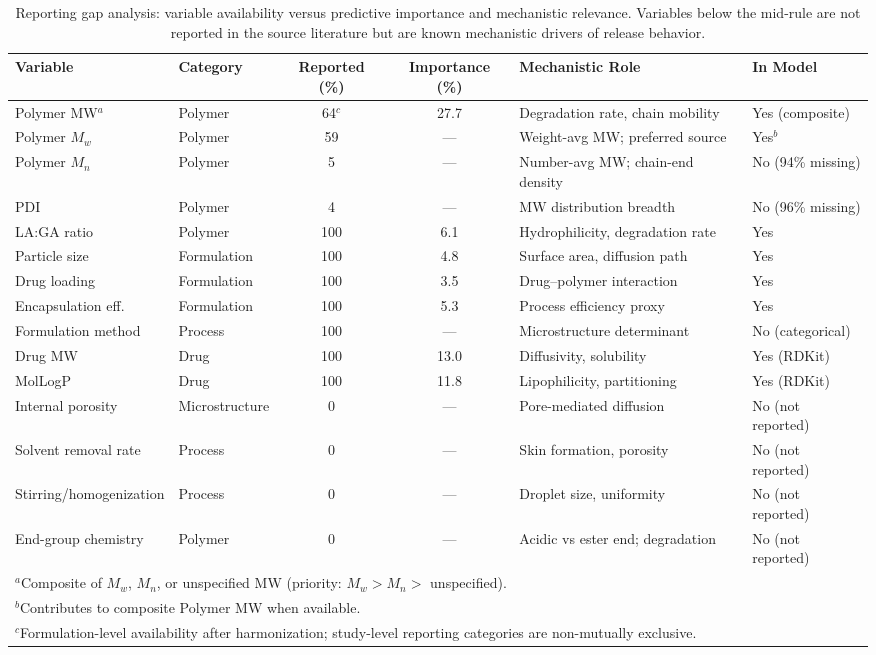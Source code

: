 \documentclass[preprint,12pt,authoryear]{elsarticle}
\begin{document}

\begin{table}[H]
\centering
\caption{Reporting gap analysis: variable availability versus predictive importance and mechanistic relevance. Variables below the mid-rule are not reported in the source literature but are known mechanistic drivers of release behavior.}
\label{tab:reporting_gaps}
\small
\begin{tabular}{llccll}
\toprule
Variable & Category & Reported (\%) & Importance (\%) & Mechanistic Role & In Model \\
\midrule
Polymer MW$^{a}$ & Polymer & 64$^{c}$ & 27.7 & Degradation rate, chain mobility & Yes (composite) \\
Polymer $M_w$ & Polymer & 59 & --- & Weight-avg MW; preferred source & Yes$^{b}$ \\
Polymer $M_n$ & Polymer & 5 & --- & Number-avg MW; chain-end density & No (94\% missing) \\
PDI & Polymer & 4 & --- & MW distribution breadth & No (96\% missing) \\
LA:GA ratio & Polymer & 100 & 6.1 & Hydrophilicity, degradation rate & Yes \\
Particle size & Formulation & 100 & 4.8 & Surface area, diffusion path & Yes \\
Drug loading & Formulation & 100 & 3.5 & Drug--polymer interaction & Yes \\
Encapsulation eff. & Formulation & 100 & 5.3 & Process efficiency proxy & Yes \\
Formulation method & Process & 100 & --- & Microstructure determinant & No (categorical) \\
Drug MW & Drug & 100 & 13.0 & Diffusivity, solubility & Yes (RDKit) \\
MolLogP & Drug & 100 & 11.8 & Lipophilicity, partitioning & Yes (RDKit) \\
\midrule
Internal porosity & Microstructure & 0 & --- & Pore-mediated diffusion & No (not reported) \\
Solvent removal rate & Process & 0 & --- & Skin formation, porosity & No (not reported) \\
Stirring/homogenization & Process & 0 & --- & Droplet size, uniformity & No (not reported) \\
End-group chemistry & Polymer & 0 & --- & Acidic vs ester end; degradation & No (not reported) \\
\bottomrule
\multicolumn{6}{l}{\footnotesize $^{a}$Composite of $M_w$, $M_n$, or unspecified MW (priority: $M_w > M_n >$ unspecified).} \\
\multicolumn{6}{l}{\footnotesize $^{b}$Contributes to composite Polymer MW when available.} \\
\multicolumn{6}{l}{\footnotesize $^{c}$Formulation-level availability after harmonization; study-level reporting categories are non-mutually exclusive.} \\
\end{tabular}
\end{table}
\end{document}
